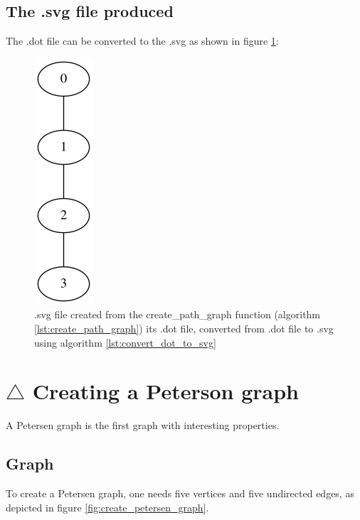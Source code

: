 \subsection{The .svg file produced}
\label{subsec:create_path_graph.svg}

The .dot file can be converted to the .svg 
as shown in figure \ref{fig:create_path_graph.svg}:

\begin{figure}[!htbp]
  \includegraphics[]{create_path_graph_4.png}
  \caption{
    .svg file created from the create\_path\_graph function 
    (algorithm \ref{lst:create_path_graph}) 
    its .dot file, converted from .dot file to .svg 
    using algorithm \ref{lst:convert_dot_to_svg}
  }
  \label{fig:create_path_graph.svg}
\end{figure}

\section{$\triangle$ Creating a Peterson graph}
\label{subsec:create_petersen_graph}

A Petersen graph is the first graph with interesting properties.

\subsection{Graph}

To create a Petersen graph, one needs five vertices and five undirected
 edges, as depicted in figure 
\ref{fig:create_petersen_graph}.

